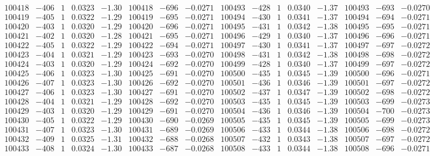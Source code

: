 \documentclass[11pt,reqno,a4letter]{article}
\numberwithin{figure}{section}
\numberwithin{table}{section}
\theoremstyle{plain}
\numberwithin{theorem}{section}
\theoremstyle{definition}
\begin{document}
\begin{table}[ht!]
\begin{equation*}
{\begin{array}{ccccc|ccc||ccccc|ccc}
100418 & -406 & 1 & 0.0323 & -1.30 & 100418 & -696 & -0.0271 & 100493 & -428 & 1 & 0.0340 & -1.37 & 100493 & -693 & -0.0270  \\
100419 & -405 & 1 & 0.0322 & -1.29 & 100419 & -695 & -0.0271 & 100494 & -430 & 1 & 0.0341 & -1.37 & 100494 & -694 & -0.0271  \\
100420 & -403 & 1 & 0.0320 & -1.29 & 100420 & -696 & -0.0271 & 100495 & -431 & 1 & 0.0342 & -1.38 & 100495 & -695 & -0.0271  \\
100421 & -402 & 1 & 0.0320 & -1.28 & 100421 & -695 & -0.0271 & 100496 & -429 & 1 & 0.0340 & -1.37 & 100496 & -696 & -0.0271  \\
100422 & -405 & 1 & 0.0322 & -1.29 & 100422 & -694 & -0.0271 & 100497 & -430 & 1 & 0.0341 & -1.37 & 100497 & -697 & -0.0272  \\
100423 & -404 & 1 & 0.0321 & -1.29 & 100423 & -693 & -0.0270 & 100498 & -431 & 1 & 0.0342 & -1.38 & 100498 & -698 & -0.0272  \\
100424 & -403 & 1 & 0.0320 & -1.29 & 100424 & -692 & -0.0270 & 100499 & -428 & 1 & 0.0340 & -1.37 & 100499 & -697 & -0.0272  \\
100425 & -406 & 1 & 0.0323 & -1.30 & 100425 & -691 & -0.0270 & 100500 & -435 & 1 & 0.0345 & -1.39 & 100500 & -696 & -0.0271  \\
100426 & -407 & 1 & 0.0323 & -1.30 & 100426 & -692 & -0.0270 & 100501 & -436 & 1 & 0.0346 & -1.39 & 100501 & -697 & -0.0272  \\
100427 & -406 & 1 & 0.0323 & -1.30 & 100427 & -691 & -0.0270 & 100502 & -437 & 1 & 0.0347 & -1.39 & 100502 & -698 & -0.0272  \\
100428 & -404 & 1 & 0.0321 & -1.29 & 100428 & -692 & -0.0270 & 100503 & -435 & 1 & 0.0345 & -1.39 & 100503 & -699 & -0.0273  \\
100429 & -403 & 1 & 0.0320 & -1.29 & 100429 & -691 & -0.0270 & 100504 & -436 & 1 & 0.0346 & -1.39 & 100504 & -700 & -0.0273  \\
100430 & -405 & 1 & 0.0322 & -1.29 & 100430 & -690 & -0.0269 & 100505 & -435 & 1 & 0.0345 & -1.39 & 100505 & -699 & -0.0273  \\
100431 & -407 & 1 & 0.0323 & -1.30 & 100431 & -689 & -0.0269 & 100506 & -433 & 1 & 0.0344 & -1.38 & 100506 & -698 & -0.0272  \\
100432 & -409 & 1 & 0.0325 & -1.31 & 100432 & -688 & -0.0268 & 100507 & -432 & 1 & 0.0343 & -1.38 & 100507 & -697 & -0.0272  \\
100433 & -408 & 1 & 0.0324 & -1.30 & 100433 & -687 & -0.0268 & 100508 & -433 & 1 & 0.0344 & -1.38 & 100508 & -696 & -0.0271  \\

\end{array}}
\end{equation*}
\end{table}
\end{document}
